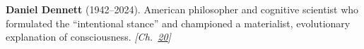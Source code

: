 \textbf{Daniel Dennett} (1942–2024). American philosopher and cognitive scientist who formulated the ``intentional stance'' and championed a materialist, evolutionary explanation of consciousness. \emph{[Ch.~\hyperref[ch:chineseroomargument]{20}]}

